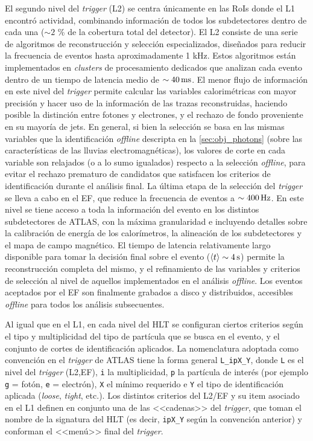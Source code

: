 El segundo nivel del \emph{trigger} (L2) se centra únicamente en las RoIs donde el L1
encontró actividad, combinando información de todos los subdetectores dentro de
cada una ($\sim 2$ \% de la cobertura total del detector). El L2 consiste de una
serie de algoritmos de reconstrucción y selección especializados, dise\~nados
para reducir la frecuencia de eventos hasta aproximadamente 1 kHz. Estos
algoritmos están implementados en \emph{clusters} de procesamiento dedicados
que analizan cada evento dentro de un tiempo de latencia medio de $\sim
\unit[40]{ms}$. El menor flujo de información en este nivel del \emph{trigger} permite
calcular las variables calorimétricas con mayor precisión y hacer uso de la
información de las trazas reconstruidas, haciendo posible la distinción entre
fotones y electrones, y el rechazo de fondo proveniente en su mayoría de jets.
En general, si bien la selección se basa en las mismas variables que la
identificación \emph{offline} descripta en la \cref{sec:obj_photons} (sobre las características de
las lluvias electromagnéticas), los valores de corte en cada variable son
relajados (o a lo sumo igualados) respecto a la selección \emph{offline}, para evitar
el rechazo prematuro de candidatos que satisfacen los criterios de identificación
durante el análisis final. La última etapa de la selección del \emph{trigger} se lleva
a cabo en el EF, que reduce la frecuencia de eventos a $\sim \unit[400]{Hz}$.
En este nivel se tiene acceso a toda
la información del evento en los distintos subdetectores de ATLAS, con la máxima
granularidad e incluyendo detalles sobre la calibración de energía de los
calorímetros, la alineación de los subdetectores y el mapa de campo magnético. El
tiempo de latencia relativamente largo disponible para tomar la decisión final
sobre el evento ($\avg{t} \sim \unit[4]{s}$) permite la reconstrucción completa
del mismo, y el refinamiento de las variables y criterios de selección al nivel
de aquellos implementados en el análisis \emph{offline}. Los eventos aceptados por el
EF son finalmente grabados a disco y distribuidos, accesibles \emph{offline} para todos
los análisis subsecuentes.

Al igual que en el L1, en cada nivel del HLT se configuran ciertos
criterios según el tipo y multiplicidad del tipo de partícula que se busca en el
evento, y el conjunto de cortes de identificación aplicados. La nomenclatura
adoptada como convención en el \emph{trigger} de ATLAS tiene la forma general
\texttt{L\_ipX\_Y}, donde \texttt{L} es el nivel del \emph{trigger} (L2,EF), \texttt{i}
la multiplicidad, \texttt{p} la partícula de interés (por ejemplo
\texttt{g} = fotón, \texttt{e} = electrón), \texttt{X} el {\pt} mínimo requerido e
\texttt{Y} el tipo de identificación aplicada (\emph{loose}, \emph{tight}, etc.). Los
distintos criterios del L2/EF y su item asociado en el L1 definen en conjunto
una de las <<cadenas>> del \emph{trigger}, que toman el nombre de la signatura del
HLT (es decir, \texttt{ipX\_Y} según la convención anterior) y conforman el <<menú>> final
del \emph{trigger}.


